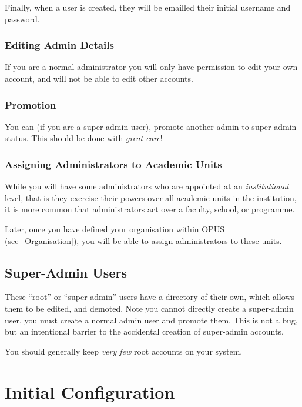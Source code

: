 \documentclass[12 pt]{book}
\begin{document}
Finally, when a user is created, they will be emailled their
initial username and password.

\subsection{Editing Admin Details}

If you are a normal administrator you will only have permission to edit your own
account, and will not be able to edit other accounts.


\subsection{Promotion}

You can (if you are a super-admin user), promote another admin to super-admin
status. This should be done with \emph{great care}!

\subsection{Assigning Administrators to Academic Units}

While you will have some administrators who are appointed at an \emph{institutional}
level, that is they exercise their powers over all academic units in the institution,
it is more common that administrators act over a faculty, school, or programme.

Later, once you have defined your organisation within OPUS (see~\ref{Organisation}),
you will be able to assign administrators to these units.

\section{Super-Admin Users}

These ``root'' or ``super-admin'' users have a directory of their own, which
allows them to be edited,
and demoted. Note you cannot directly create a super-admin user, you must 
create a normal admin user and promote them. This is not a bug, but an
intentional barrier to the accidental creation of super-admin accounts.

You should generally keep \emph{very few} root accounts on your system.

\chapter{Initial Configuration}
\end{document}
